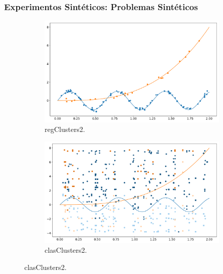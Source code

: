 \documentclass[aspectratio=43]{beamer}
\newcommand{\fdata}[1]{\textsf{#1}}
\begin{document}
\begin{frame}
      \frametitle{Experimentos Sintéticos: Problemas Sintéticos}

      \begin{figure}
      \begin{subfigure}[b]{0.49\textwidth}
            \centering
            \includegraphics[width=\textwidth]{Chapter6/IGPL2022/regClusters__2.pdf}
            \caption{\fdata{regClusters2}.}
      \end{subfigure}
      \hfill
      \begin{subfigure}[b]{0.49\textwidth}
            \centering
            \includegraphics[width=\textwidth]{Chapter6/IGPL2022/clasClusters__2.pdf}
            \caption{\fdata{clasClusters2}.}
      \end{subfigure}
      \end{figure}

\end{frame}
\end{document}
